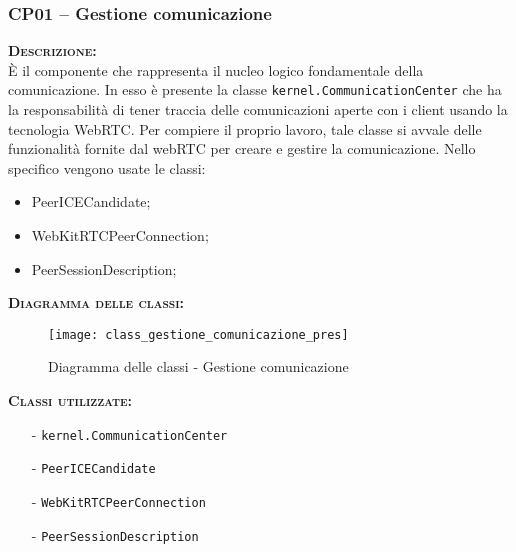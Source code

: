 \subsubsection{CP01 -- Gestione comunicazione}
\begin{description}
	\item{\scshape\bfseries Descrizione:}\\
È il componente che rappresenta il nucleo logico fondamentale della comunicazione. In esso è presente la classe \texttt{kernel.CommunicationCenter} che ha la responsabilità di tener traccia delle comunicazioni aperte con i client usando la tecnologia WebRTC\@. Per compiere il proprio lavoro, tale classe si avvale delle funzionalità fornite dal webRTC per creare e gestire la comunicazione. Nello specifico vengono usate le classi:

\begin{itemize}
	\item PeerICECandidate;
	\item WebKitRTCPeerConnection;
	\item PeerSessionDescription;
\end{itemize}

	\item{\scshape\bfseries Diagramma delle classi:}
  \begin{figure}[H]
    \centering
    \texttt{[image: class\_gestione\_comunicazione\_pres]}
    \caption{Diagramma delle classi - Gestione comunicazione}\label{fig:gestionecomunicazione}
  \end{figure}

	\item{\scshape\bfseries Classi utilizzate:} 
	\begin{itemize}[noitemsep,nolistsep]
		\item[-] \texttt{kernel.CommunicationCenter}
		\item[-] \texttt{PeerICECandidate}
		\item[-] \texttt{WebKitRTCPeerConnection}
		\item[-] \texttt{PeerSessionDescription}
	\end{itemize}  
\end{description}

